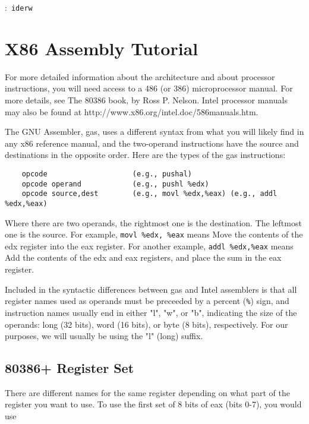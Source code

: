 \documentclass{note}
\begin{document}
{\w {}:\ \texttt{iderw}
\eit


\pagebreak
\section{X86 Assembly Tutorial}
For more detailed information about the architecture and about processor
instructions, you will need access to a 486 (or 386) microprocessor
manual. For more details, see The 80386 book, by Ross P. Nelson.
Intel
processor manuals may also be found at
http://www.x86.org/intel.doc/586manuals.htm. 

The GNU Assembler, gas, uses a different syntax from what you will likely find in any x86 reference manual, and the two-operand instructions have the source and destinations in the opposite order. Here are the types of the gas instructions:
\begin{verbatim}
    opcode                    (e.g., pushal)
    opcode operand            (e.g., pushl %edx)
    opcode source,dest        (e.g., movl %edx,%eax) (e.g., addl %edx,%eax)
\end{verbatim}
Where there are two operands, the rightmost one is the destination. The leftmost one is the source. 
For example, \verb+movl %edx, %eax+ means Move the contents of the edx
register into the eax register. For another example,
                        \verb+addl %edx,%eax+ means Add the contents of the edx and
                        eax registers, and place the sum in the eax
                        register. 

Included in the syntactic differences between gas and Intel assemblers is that
all register names used as operands must be preceeded by a percent (\verb+%+)
                                sign, and instruction names usually end in
                                either "l", "w", or "b", indicating the size
                                of the operands: long (32 bits), word (16
                                bits), or byte (8 bits), respectively. For
                                our purposes, we will usually be using the
                                "l" (long) suffix. 

\subsection{80386+ Register Set}
There are different names for the same register depending on what part of the register you want to use. To use the first set of 8 bits of eax (bits 0-7), you would use %

}
\end{document}

